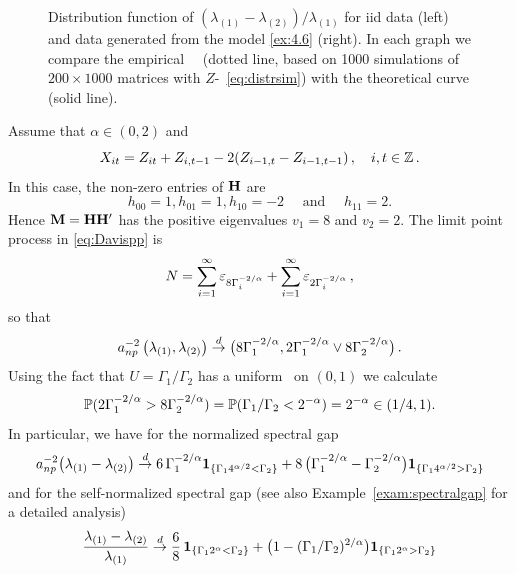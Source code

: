 \begin{example}
\begin{figure}[htb!]
{  }
  \caption{Distribution function of $(\lambda_{(1)} - \lambda_{(2)})/\lambda_{(1)}$ for iid data (left) and
    data generated from the model \eqref{ex:4.6} (right). In each graph we compare the empirical \ds\ \fct\
(dotted line, based on
1000 simulations of $200 \times 1000$ matrices with $Z$-\ds\ \eqref{eq:distrsim}) with the theoretical curve (solid line).}
  \label{fig:ProbMass}
\end{figure}
Assume that $\alpha\in (0,2)$ and
\begin{equation}\label{ex:4.6}
X_{it}= Z_{it}+ Z_{i,t-1}-2 (Z_{i-1,t}- Z_{i-1,t-1})\,,\quad i,t\in\Z\,.
\end{equation}
In this case, the non-zero entries of $\H$ are
\begin{equation*}
h_{00}=1, h_{01}=1,h_{10}=-2 \quad \mbox{ and }\quad h_{11}=2.
\end{equation*}
Hence $\M=\H\H'$ has the positive eigenvalues
$v_1=8$ and $v_2=2$. The limit point process in \eqref{eq:Davispp} is
\begin{equation*}
N=\sum_{i=1}^\infty \vep_{8\Gamma_i^{-2/\alpha}}+ \sum_{i=1}^\infty \vep_{2\Gamma_i^{-2/\alpha}}\,,
\end{equation*}
so that
\begin{equation*}
a_{np}^{-2}\,\big(\la_{(1)},\la_{(2)}\big) \cid
\big(8\Gamma_{1}^{-2/\alpha}, 2\Gamma_1^{-2/\alpha}\vee 8
\Gamma_2^{-2/\alpha}\big)\,.
\end{equation*}
Using the fact that $U=\Gamma_1/\Gamma_2$ has a uniform \ds\ on $(0,1)$ we calculate
\begin{equation*}
\P(2\Gamma_1^{-2/\alpha}>8\Gamma_2^{-2/\alpha})= \P(\Gamma_1/\Gamma_2<2^{-\alpha})= 2^{-\alpha} \in (1/4,1).
\end{equation*}
In particular, we have for the normalized spectral gap
\begin{equation*}
a_{np}^{-2} \big(\la_{(1)}-\la_{(2)}\big)\cid
6 \,\Gamma_1^{-2/\alpha} \1_{\{\Gamma_1 4^{\alpha/2 }<\Gamma_2\}}+
8\,
\big(\Gamma_1^{-2/\alpha}-\Gamma_2^{-2/\alpha}\big)\1_{\{\Gamma_14^{\alpha/2
  }> \Gamma_2\}}
\end{equation*}
and for the self-normalized spectral gap (see also Example~\ref{exam:spectralgap} for a detailed analysis)
\begin{equation*}
\begin{split}
\dfrac{\la_{(1)}-\la_{(2)}}{\la_{(1)}}&\cid
\dfrac{6}{8} \, \1_{\{\Gamma_1 2^{\alpha }<\Gamma_2\}}+
\big(1-(\Gamma_1/\Gamma_2)^{2/\alpha}\big)\1_{\{\Gamma_12^{\alpha
  }> \Gamma_2\}}\\

\end{split}
\end{equation*}
\end{example}
